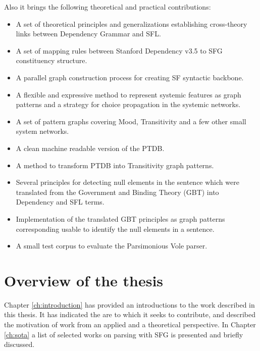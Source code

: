 Also it brings the following theoretical and practical contributions:
\begin{itemize}

    \item A set of theoretical principles and generalizations establishing cross-theory links between Dependency Grammar and SFL. 
    \item A set of mapping rules between Stanford Dependency v3.5 to SFG constituency structure.
    \item A parallel graph construction process for creating SF syntactic backbone.
    
    \item A flexible and expressive method to represent systemic features as graph patterns and a strategy for choice propagation in the systemic networks.
    \item A set of pattern graphs covering Mood, Transitivity and a few other small system networks.
    \item A clean machine readable version of the PTDB. 
    \item A method to transform PTDB into Transitivity graph patterns. 

    \item Several principles for detecting null elements in the sentence which were translated from the Government and Binding Theory (GBT) into Dependency and SFL terms. 
    \item Implementation of the translated GBT principles as graph patterns corresponding usable to identify the null elements in a sentence.
    \item A small test corpus to evaluate the Parsimonious Vole parser.
\end{itemize}

\section{Overview of the thesis}
\label{sec:thesis-structure}

Chapter \ref{ch:introduction} has provided an introductions to the work described in this thesis. It has indicated the are to which it seeks to contribute, and described the motivation of work from an applied and a theoretical perspective. In Chapter \ref{ch:sota} a list of selected works on parsing with SFG is presented and briefly discussed. 

